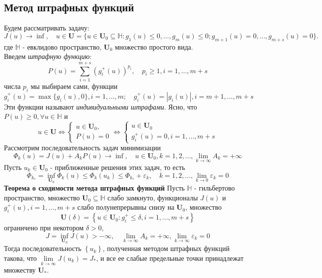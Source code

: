 \documentclass[A4]{article}
\begin{document}
\subsection{Метод штрафных функций}
Будем рассматривать задачу:
\begin{equation*}
J(u)\rightarrow\inf,\quad u\in\mathbf{U}=\{u\in\mathbf{U}_0\subseteq\mathbb{H}:g_1(u)\leqslant 0,\ldots,g_m(u)\leqslant 0;g_{m+1}(u)=0,\ldots,g_{m+s}(u)=0\}.
\end{equation*}
где $\mathbb{H}$ - евклидово пространство, $\mathbf{U}_0$ множество простого вида.\\
Введем \emph{штрафную функцию}:
\begin{equation*}
P(u)=\sum_{i=1}^{m+s}(g_i^+(u))^{p_i},\quad p_i\geqslant 1,i=1,\ldots,m+s
\end{equation*} 
числа $p_i$ мы выбираем сами, функции
\begin{equation*}
 g_i^+(u)=\max \{g_i(u),0 \},i=1,\ldots,m;\quad g_i^+(u)=|g_i(u)|,i=m+1,\ldots,m+s
\end{equation*}
Эти функции называют \emph{индивидуальными штрафами}. Ясно, что $P(u)\geqslant 0,\forall u\in\mathbb{H}$ и 
\begin{equation*}
u\in\mathbf{U}\Leftrightarrow \left\{\begin{array}{l}
u\in \mathbf{U}_0,\\
P(u)=0
\end{array}\right. \Leftrightarrow \left\{\begin{array}{l}
u\in\mathbf{U}_0\\
g_i^+(u)=0,i=1,\ldots,m+s
\end{array}\right. 
\end{equation*}
Рассмотрим последовательность задач минимизации
\begin{equation*}
\Phi_k(u)=J(u)+A_kP(u)\rightarrow\inf,\quad u\in\mathbf{U}_0,k=1,2,\ldots,\lim_{k\rightarrow\infty} A_k =+\infty
\end{equation*}
Пусть $u_k\in\mathbf{U}_0$ - приближенные решения этих задач, то есть
\begin{equation*}
\Phi_{k_*}=\inf_{\mathbf{U}_0}\Phi_k(u)\leqslant \Phi_k(u_k)\leqslant \Phi_{k_*}+\varepsilon_k,\quad k=1,2,\ldots, \lim_{k\rightarrow 0}\varepsilon_k=0 
\end{equation*}
\textbf{Теорема о сходимости метода штрафных функций} Пусть $\mathbb{H}$ - гильбертово пространство, множество $ \mathbf{U}_{0} \subseteq \mathbb{H} $ слабо замкнуто, функционалы $ J(u) $ и $ g_{i}^{+}(u),   i=1, \ldots, m+s $ слабо полунепрерывны снизу на $ \mathbf{U}_{0} $, множество
\begin{equation*}
\mathbf{U}(\delta)=\left\{u \in \mathbf{U}_{0}: g_{i}^{+} \leqslant \delta, i=1, \ldots, m+s\right\}
\end{equation*}
ограничено при некотором $ \delta>0$, 
\begin{equation*}
J=\inf _{\mathbf{U}_{0}} J(u)>-\infty, \quad \lim _{k \rightarrow \infty} A_{k}=+\infty, \lim _{k \rightarrow \infty} \varepsilon_{k}=0
\end{equation*}
Тогда последовательность $ \left\{u_{k}\right\}$, полученная методом штрафных функций такова, что $ \lim \limits_{k \rightarrow \infty} J\left(u_{k}\right)=J_{*}$, и все ее слабые предельные точки принадлежат множеству $ \mathbf{U}_{*} $.
\end{document}
